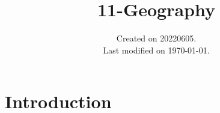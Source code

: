 \documentclass[UTF8]{../RepresentationUniverse}
\begin{document}
\title{11-Geography}
\date{Created on 20220605.\\   Last modified on \today.}
\maketitle
\tableofcontents


\chapter{Introduction}
\end{document}
